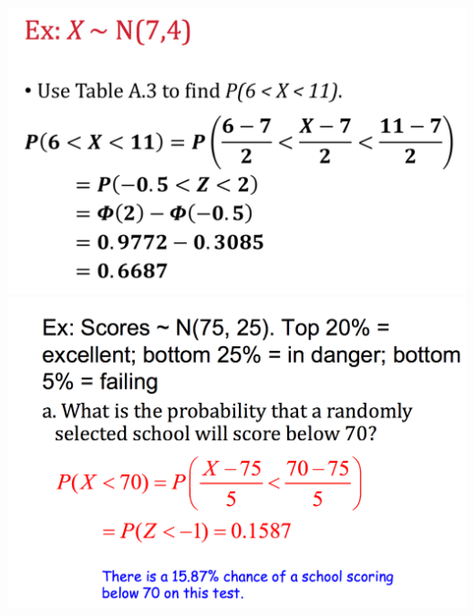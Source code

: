 \documentclass[9pt]{extarticle}
\begin{document}
	\includegraphics[scale=0.15]{1.png} \includegraphics[scale=0.15]{2.png}
\end{document}
